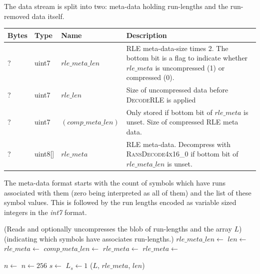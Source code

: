 \documentclass[a4paper]{article}
\begin{document}
The data stream is split into two: meta-data holding run-lengths
and the run-removed data itself.

\begin{table}[h]
\centering
\begin{tabular}{lllp{9cm}}
\textbf{Bytes} & \textbf{Type} & \textbf{Name} & \textbf{Description}\\
\hline
? & uint7   & $rle\_meta\_len$     & RLE meta-data-size times 2. The bottom bit is a flag to indicate whether $rle\_meta$ is uncompressed (1) or compressed (0). \\
? & uint7   & $rle\_len$           & Size of uncompressed data before \textsc{DecodeRLE} is applied \\
? & uint7   & $(comp\_meta\_len)$  & Only stored if bottom bit of $rle\_meta$ is unset.  Size of compressed RLE meta data. \\
? & uint8[] & $rle\_meta$          & RLE meta-data.  Decompress with \textsc{RansDecode4x16\_0} if bottom bit of $rle\_meta\_len$ is unset. \\
\end{tabular}
\end{table}

The meta-data format starts with the count of symbols which have runs
associated with them (zero being interpreted as all of them) and the
list of these symbol values.  This is followed by the run lengths
encoded as variable sized integers in the \emph{int7} format.

\begin{algorithmic}[1]
\Statex (Reads and optionally uncompresses the blob of run-lengths and the array $L$)
\Statex (indicating which symbols have associates run-lengths.)
  \State $rle\_meta\_len \gets $
  \State $len \gets $ 
    \State $rle\_meta \gets $
  \Else
    \State $comp\_meta\_len \gets $
    \State $rle\_meta \gets $
    \State $rle\_meta \gets $
    \EndIf

  \Statex
  \State $n \gets$ 
    \State $n \gets 256$
  \EndIf
    \State $s \gets$ 
    \State $L_s \gets 1$
  \EndFor
  \Statex
  \State \Return ($L$, $rle\_meta$, $len$)
\EndFunction
\end{algorithmic}
\end{document}
